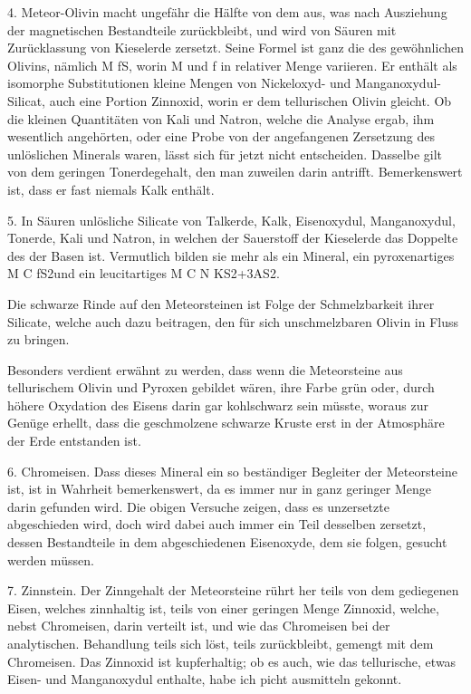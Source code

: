 \documentclass[a4paper, 11pt, oneside]{article}
\begin{document}
4. Meteor-Olivin macht ungefähr die Hälfte von dem aus, was nach Ausziehung der magnetischen Bestandteile zurückbleibt, und wird von Säuren mit Zurücklassung von Kieselerde zersetzt. Seine Formel ist ganz die des gewöhnlichen Olivins, nämlich {M f}S, worin M und f in relativer Menge variieren. Er enthält als isomorphe Substitutionen kleine Mengen von Nickeloxyd- und Manganoxydul-Silicat, auch eine Portion Zinnoxid, worin er dem tellurischen Olivin gleicht. Ob die kleinen Quantitäten von Kali und Natron, welche die Analyse ergab, ihm wesentlich angehörten, oder eine Probe von der angefangenen Zersetzung des unlöslichen Minerals waren, lässt sich für jetzt nicht entscheiden. Dasselbe gilt von dem geringen Tonerdegehalt, den man zuweilen darin antrifft. Bemerkenswert ist, dass er fast niemals Kalk enthält.

5. In Säuren unlösliche Silicate von Talkerde, Kalk, Eisenoxydul, Manganoxydul, Tonerde, Kali und Natron, in welchen der Sauerstoff der Kieselerde das Doppelte des der Basen ist. Vermutlich bilden sie mehr als ein Mineral, ein pyroxenartiges {M C f}S2und ein leucitartiges {M C N K}S2+3AS2.

Die schwarze Rinde auf den Meteorsteinen ist Folge der Schmelzbarkeit ihrer Silicate, welche auch dazu beitragen, den für sich unschmelzbaren Olivin in Fluss zu bringen.

Besonders verdient erwähnt zu werden, dass wenn die Meteorsteine aus tellurischem Olivin und Pyroxen gebildet wären, ihre Farbe grün oder, durch höhere Oxydation des Eisens darin gar kohlschwarz sein müsste, woraus zur Genüge erhellt, dass die geschmolzene schwarze Kruste erst in der Atmosphäre der Erde entstanden ist.

6. Chromeisen. Dass dieses Mineral ein so beständiger Begleiter der Meteorsteine ist, ist in Wahrheit bemerkenswert, da es immer nur in ganz geringer Menge darin gefunden wird. Die obigen Versuche zeigen, dass es unzersetzte abgeschieden wird, doch wird dabei auch immer ein Teil desselben zersetzt, dessen Bestandteile in dem abgeschiedenen Eisenoxyde, dem sie folgen, gesucht werden müssen.

7. Zinnstein. Der Zinngehalt der Meteorsteine rührt her teils von dem gediegenen Eisen, welches zinnhaltig ist, teils von einer geringen Menge Zinnoxid, welche, nebst Chromeisen, darin verteilt ist, und wie das Chromeisen bei der analytischen. Behandlung teils sich löst, teils zurückbleibt, gemengt mit dem Chromeisen. Das Zinnoxid ist kupferhaltig; ob es auch, wie das tellurische, etwas Eisen- und Manganoxydul enthalte, habe ich picht ausmitteln gekonnt.
\end{document}
